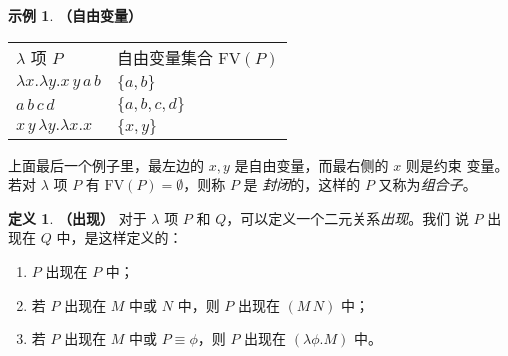 \documentclass[a4paper,adobefonts]{ctexart}
\newenvironment{tightenum}{
  \begin{enumerate}
    \setlength{\itemsep}{0cm}
    \setlength{\parskip}{0cm}
    \setlength{\itemindent}{2\ccwd}
}{
  \end{enumerate}
}
\theoremstyle{definition}
\newtheorem{definition}{定义}
\newtheorem{example}{示例}
\begin{document}
\begin{example}{\bfseries{（自由变量）}}
  \begin{center}
    \begin{tabular*}{.7\textwidth}{@{\extracolsep{\fill} }ll}
      $\lambda$ 项 $P$ & 自由变量集合 $\text{FV}(P)$\\
      $\lambda x.\lambda y.x\,y\,a\,b$ & $\{a,b\}$\\
      $a\,b\,c\,d$ & $\{a,b,c,d\}$\\
      $x\,y\,\lambda y.\lambda x.x$ & $\{x,y\}$
    \end{tabular*}
  \end{center}
\end{example}

上面最后一个例子里，最左边的 $x,y$ 是自由变量，而最右侧的 $x$ 则是约束
变量。若对 $\lambda$ 项 $P$ 有 $\text{FV}(P)=\emptyset$，则称 $P$ 是
\emph{封闭}的，这样的 $P$ 又称为\emph{组合子}。

\begin{definition}{\bfseries{（出现）}}
  对于 $\lambda$ 项 $P$ 和 $Q$，可以定义一个二元关系\emph{出现}。我们
  说 $P$ 出现在 $Q$ 中，是这样定义的：
  \begin{tightenum}
  \item $P$ 出现在 $P$ 中；
  \item 若 $P$ 出现在 $M$ 中或 $N$ 中，则 $P$ 出现在 $(M\,N)$ 中；
  \item 若 $P$ 出现在 $M$ 中或 $P\equiv\phi$，则 $P$ 出现在 $(\lambda\phi.M)$ 中。
  \end{tightenum}
\end{definition}
\end{document}
